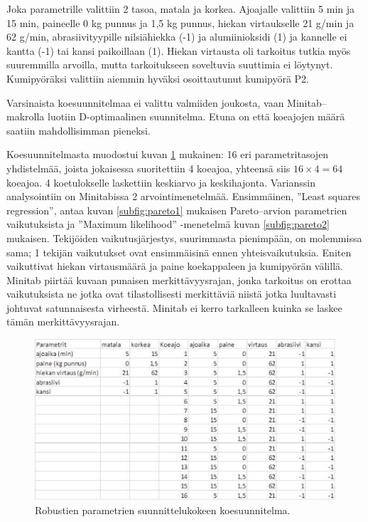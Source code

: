 \documentclass[12pt,a4paper,finnish]{tutthesis}
\begin{document}
Joka parametrille valittiin 2 tasoa, matala ja korkea. Ajoajalle valittiin 5 min ja 15 min, paineelle 0 kg punnus ja 1,5 kg punnus, hiekan virtaukselle 21 g/min ja 62 g/min, abrasiivityypille nilsiähiekka (-1) ja alumiinioksidi (1) ja kannelle ei kantta (-1) tai kansi paikoillaan (1). Hiekan virtausta oli tarkoitus tutkia myös suuremmilla arvoilla, mutta tarkoitukseen soveltuvia suuttimia ei löytynyt. Kumipyöräksi valittiin aiemmin hyväksi osoittautunut kumipyörä P2.

Varsinaista koesuunnitelmaa ei valittu valmiiden joukosta, vaan Minitab–makrolla luotiin D-optimaalinen suunnitelma. Etuna on että koeajojen määrä saatiin mahdollisimman pieneksi.

Koesuunnitelmasta muodostui kuvan \ref{fig:tarray} mukainen:
16 eri parametritasojen yhdistelmää, joista jokaisessa suoritettiin 4 koeajoa, yhteensä siis \(16\times 4 = 64\) koeajoa. 4 koetulokselle laskettiin keskiarvo ja keskihajonta.
Varianssin analysointiin on Minitabissa 2 arvointimenetelmää. Ensimmäinen, ”Least squares regression”, antaa kuvan \ref{subfig:pareto1} mukaisen Pareto–arvion parametrien vaikutuksista
ja ”Maximum likelihood” -menetelmä kuvan \ref{subfig:pareto2} mukaisen.
Tekijöiden vaikutusjärjestys, suurimmasta pienimpään, on molemmissa sama;
1 tekijän vaikutukset ovat ensimmäisinä ennen yhteisvaikutuksia.
Eniten vaikuttivat hiekan virtausmäärä ja paine koekappaleen ja kumipyörän välillä.
Minitab piirtää kuvaan punaisen merkittävyysrajan, jonka tarkoitus on erottaa vaikutuksista ne
jotka ovat tilastollisesti merkittäviä niistä jotka luultavasti johtuvat satunnaisesta virheestä.
Minitab ei kerro tarkalleen kuinka se laskee tämän merkittävyysrajan.

\begin{figure}
  \begin{center}
    \includegraphics[width=1.0\textwidth]{tarray}
  \end{center}
  \caption[Robustien parametrien koesuunnitelma]{Robustien parametrien suunnittelukokeen koesuunnitelma.}
  \label{fig:tarray}
\end{figure}
\end{document}
